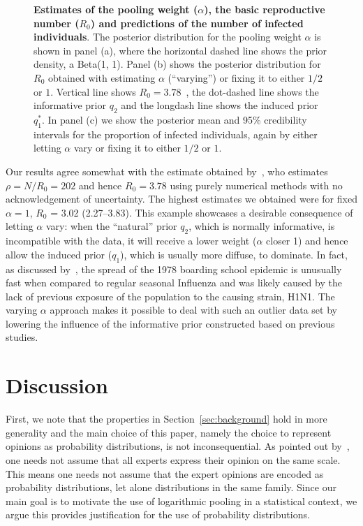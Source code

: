 \documentclass[a4paper, notitlepage, 10pt]{article}
\begin{document}
\begin{figure}[!ht]
\begin{center}
\end{center}
\caption{\textbf{Estimates of the pooling weight ($\alpha$), the basic reproductive number ($R_0$) and predictions of the number of infected individuals}.
The posterior distribution for the pooling weight $\alpha$ is shown in panel (a), where the horizontal dashed line shows the prior density, a Beta(1, 1).
Panel (b) shows the posterior distribution for $R_0$ obtained with estimating $\alpha$ (``varying'') or fixing it to either $1/2$ or $1$.
Vertical line shows $R_0 = 3.78$~\citep{Murray2002}, the dot-dashed line shows the informative prior $q_2$ and the longdash line shows the induced prior $q_1^\ast$.
In panel (c) we show the posterior mean and 95\% credibility intervals for the proportion of infected individuals, again by either letting $\alpha$ vary or fixing it to either $1/2$ or $1$.
}
\label{fig:SIR_results}
\end{figure}

Our results agree somewhat with the estimate obtained by~\cite{Murray2002}, who estimates $\rho = N/R_0 = 202$ and hence $R_0 = 3.78$ using purely numerical methods with no acknowledgement of uncertainty.
The highest estimates we obtained were for fixed $\alpha = 1$, $R_0$ = 3.02 (2.27--3.83).
This example showcases a desirable consequence of letting $\alpha$ vary: when the ``natural'' prior $q_2$, which is normally informative, is incompatible with the data, it will receive a lower weight ($\alpha$ closer 1) and hence allow the induced prior ($q_1$), which is usually more diffuse, to dominate.
In fact, as discussed by~\cite{Biggerstaff2014}, the spread of the 1978 boarding school epidemic is unusually fast when compared to regular seasonal Influenza and was likely caused by the lack of previous exposure of the population to the causing strain, H1N1.
The varying $\alpha$ approach makes it possible to deal with such an outlier data set by lowering the influence of the informative prior constructed based on previous studies.

\section{Discussion}
\label{sec:discussion}

First, we note that the properties in Section~\ref{sec:background} hold in more generality and the main choice of this paper, namely the choice to represent opinions as probability distributions, is not inconsequential.
As pointed out by~\cite{French1985}, one needs not assume that all experts express their opinion on the same scale.
This means one needs not assume that the expert opinions are encoded as probability distributions, let alone distributions in the same family.
Since our main goal is to motivate the use of logarithmic pooling in a statistical context, we argue this provides justification for the use of probability distributions.
\end{document}
